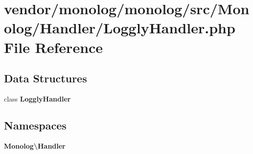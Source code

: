 \section{vendor/monolog/monolog/src/\+Monolog/\+Handler/\+Loggly\+Handler.php File Reference}
\label{_loggly_handler_8php}
\subsection*{Data Structures}
\begin{DoxyCompactItemize}
\item 
class {\bf Loggly\+Handler}
\end{DoxyCompactItemize}
\subsection*{Namespaces}
\begin{DoxyCompactItemize}
\item 
 {\bf Monolog\textbackslash{}\+Handler}
\end{DoxyCompactItemize}
